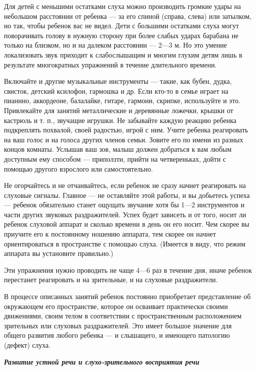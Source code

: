 \documentclass[a5paper]{book}
\renewcommand{\emph}[1]{\textit{#1}}
\begin{document}
Для детей с меньшими остатками слуха можно производить громкие удары на
небольшом расстоянии от ребенка --- за его спиной (справа, слева) или
затылком, но так, чтобы ребенок вас не видел. Дети с большими остатками
слуха могут поворачивать голову в нужную сторону при более слабых ударах
барабана не только на близком, но и на далеком расстоянии --- 2---3 м.
Но это умение локализовать звук приходит к слабослышащим и многим глухим
детям лишь в результате многократных упражнений в течение длительного
времени.

Включайте и другие музыкальные инструменты --- такие, как бубен, дудка,
свисток, детский ксилофон, гармошка и др. Если кто-то в семье играет на
пианино, аккордеоне, балалайке, гитаре, гармони, скрипке, используйте и
это. Привлекайте для занятий металлические и деревянные ложечки, крышки
от кастрюль и т. п., звучащие игрушки. Не забывайте каждую реакцию
ребенка подкреплять похвалой, своей радостью, игрой с ним. Учите ребенка
реагировать на ваш голос и на голоса других членов семьи. Зовите его по
имени из разных концов комнаты. Услышав ваш зов, малыш должен добраться
к вам любым доступным ему способом --- приползти, прийти на
четвереньках, дойти с помощью другого взрослого или самостоятельно.

Не огорчайтесь и не отчаивайтесь, если ребенок не сразу начнет
реагировать на слуховые сигналы. Главное --- не оставляйте этой работы,
и вы добьетесь успеха --- ребенок обязательно станет ощущать звучание
хотя бы 1---2 инструментов и части других звуковых раздражителей. Успех
будет зависеть и от того, носит ли ребенок слуховой аппарат и сколько
времени в день он его носит. Чем скорее вы приучите его к постоянному
ношению аппарата, тем скорее он начнет ориентироваться в пространстве с
помощью слуха. (Имеется в виду, что режим аппарата вы установите
правильно.)

Эти упражнения нужно проводить не чаще 4---6 раз в течение дня, иначе
ребенок перестанет реагировать и на зрительные, и на слуховые
раздражители.

В процессе описанных занятий ребенок постоянно приобретает представление
об окружающем его пространстве, которое он осваивает практически своими
движениями, своим телом в соответствии с пространственным расположением
зрительных или слуховых раздражителей. Это имеет большое значение для
общего развития любого ребенка --- и слышащего, и имеющего патологию
(дефект) слуха.

\emph{\textbf{Развитие устной речи и слухо-зрительного восприятия речи}}
\end{document}
